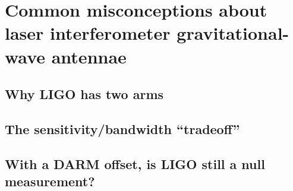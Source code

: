 \chapter{Common misconceptions about laser interferometer gravitational-wave antennae}

\section{Why LIGO has two arms}

\section{The sensitivity/bandwidth ``tradeoff''}

\section{With a DARM offset, is LIGO still a null measurement?}


